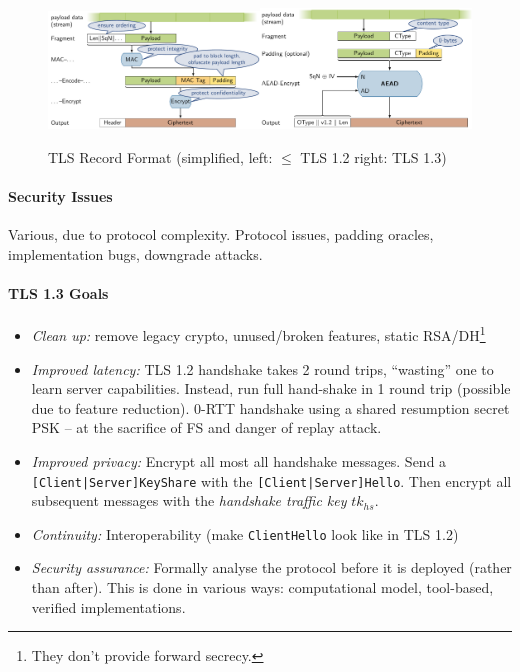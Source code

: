 \begin{figure}[h]
    \centering
	\includegraphics[width=0.5\textwidth]{images/tls-record-12.png}\includegraphics[width=0.5\textwidth]{images/tls-record-13.png}
    \caption{TLS Record Format (simplified, left: $\leq$ TLS 1.2 right: TLS 1.3)}
    \label{fig:tls-record}
\end{figure}

\paragraph{Security Issues}
Various, due to protocol complexity.
Protocol issues, padding oracles, implementation bugs, downgrade attacks.

\paragraph{TLS 1.3 Goals}
\begin{itemize}
\item \emph{Clean up:}
remove legacy crypto, unused/broken features, static RSA/DH\footnote{They don't provide forward secrecy.}
\item \emph{Improved latency:}
TLS 1.2 handshake takes 2 round trips, ``wasting'' one to learn server capabilities.
Instead, run full hand-shake in 1 round trip (possible due to feature reduction).
0-RTT handshake using a shared resumption secret PSK
-- at the sacrifice of FS and danger of replay attack.
\item \emph{Improved privacy:}
Encrypt all most all handshake messages.
Send a \texttt{[Client|Server]KeyShare} with the \texttt{[Client|Server]Hello}.
Then encrypt all subsequent messages with the \emph{handshake traffic key} $tk_{hs}$.
\item \emph{Continuity:}
Interoperability (make \texttt{ClientHello} look like in TLS 1.2)
\item \emph{Security assurance:}
Formally analyse the protocol before it is deployed (rather than after).
This is done in various ways: computational model, tool-based, verified implementations.
\end{itemize}

